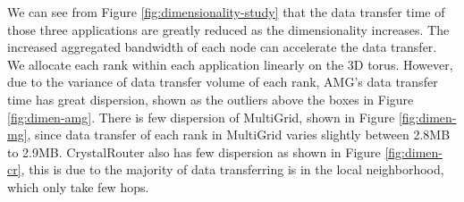 \documentclass[conference]{IEEEtran}
\begin{document}
 
We can see from Figure \ref{fig:dimensionality-study} that the data transfer time of those three applications are greatly reduced as the dimensionality increases. The increased aggregated bandwidth of each node can accelerate the data transfer. We allocate each rank within each application linearly on the 3D torus. However, due to the variance of data transfer volume of each rank, AMG's data transfer time has great dispersion, shown as the outliers above the boxes in Figure \ref{fig:dimen-amg}. There is few dispersion of MultiGrid, shown in Figure \ref{fig:dimen-mg}, since data transfer of each rank in MultiGrid varies slightly  between 2.8MB to 2.9MB. CrystalRouter also has few dispersion as shown in Figure \ref{fig:dimen-cr}, this is due to the majority of data transferring is in the local neighborhood, which only take few hops. 
\end{document}
